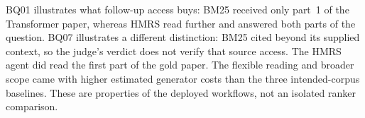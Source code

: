 BQ01 illustrates what follow-up access buys: BM25 received only part~1
of the Transformer paper, whereas HMRS read further and answered both
parts of the question. BQ07 illustrates a different distinction: BM25
cited beyond its supplied context, so the judge's verdict does not verify
that source access. The HMRS agent did read the first part of the gold
paper. The flexible reading and broader scope came with higher estimated
generator costs than the three intended-corpus baselines. These are
properties of the deployed workflows, not an isolated ranker comparison.
